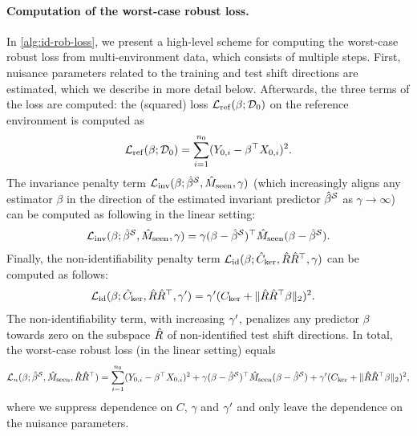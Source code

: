 \paragraph{Computation of the worst-case robust loss.} In \cref{alg:id-rob-loss}, we present a high-level scheme for computing the worst-case robust loss from multi-environment data, which consists of multiple steps. First, nuisance parameters related to the training and test shift directions are estimated, which we describe in more detail below. Afterwards, the three terms of the loss are computed: the (squared) loss $\mathcal{L}_{\mathrm{ref}}(\beta; \mathcal{D}_0)$ on the reference environment is computed as 
\begin{align*}
       \mathcal{L}_{\mathrm{ref}}(\beta; \mathcal{D}_0) = \sum_{i = 1}^{n_0} (Y_{0,i} - \beta^\top X_{0,i})^2. 
    \end{align*}
The invariance penalty term $\mathcal{L}_{\mathrm{inv}}(\beta; \hat{\beta}^{\mathcal{S}}, \hat{M}_{\mathrm{seen}}, \gamma)$ (which increasingly aligns any estimator $\beta$ in the direction of the estimated invariant predictor $\hat{\beta}^{\mathcal{S}}$ as $\gamma \to \infty$) can be computed as following in the linear setting:
    \begin{align*}
       \mathcal{L}_{\mathrm{inv}}(\beta; \hat{\beta}^{\mathcal{S}}, \hat{M}_{\mathrm{seen}}, \gamma) = \gamma  (\beta - \hat{\beta}^{\mathcal{S}})^\top \hat{M}_{\mathrm{seen}} (\beta - \hat{\beta}^{\mathcal{S}}) . 
    \end{align*}
Finally, the non-identifiability penalty term $\mathcal{L}_{\mathrm{id}}(\beta; \hat{C}_{\mathrm{ker}}, \hat{R}\hat{R}^\top, \gamma)$ can be computed as follows:
    \begin{align*}
       \mathcal{L}_{\mathrm{id}}(\beta; \hat{C}_{\mathrm{ker}}, \hat{R}\hat{R}^\top, \gamma') &= \gamma' (C_{\mathrm{ker}} + \| \hat{R}\hat{R}^\top \beta \|_2)^2. 
    \end{align*}
The non-identifiability term, with increasing $\gamma'$, penalizes any predictor $\beta$ towards zero on the subspace $\hat{R}$ of non-identified test shift directions. In total, the worst-case robust loss (in the linear setting) equals
\begin{align*}
    \mathcal{L}_n(\beta; \hat{\beta}^{\mathcal{S}}, \hat{M}_{\mathrm{seen}}, \hat{R}\hat{R}^\top) = \sum_{i = 1}^{n_0} (Y_{0,i} - \beta^\top X_{0,i})^2 + \gamma (\beta - \hat{\beta}^{\mathcal{S}})^\top \hat{M}_{\mathrm{seen}} (\beta - \hat{\beta}^{\mathcal{S}}) + \gamma' (C_{\mathrm{ker}} + \| \hat{R}\hat{R}^\top \beta \|_2)^2, 
\end{align*}
where we suppress dependence on $C$, $\gamma$ and $\gamma'$ and only leave the dependence on the nuisance parameters.
